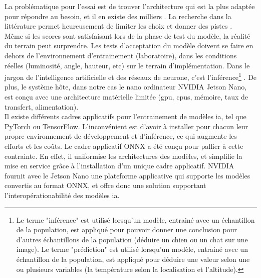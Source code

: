 \begin{comment}
Par exemple l'architecture "VGG" prend 2-3 semaines d'entrainement \parencite{simonyan_very_2015} avec 4 \acrshort{gpu} Titan Black (NVIDIA), coutant 1 200 \$US (Amazon.com) chacun (pour un total de 4 800\$US, et cela juste pour les \acrshort{gpu}s, qui ne sont qu'un des éléments de l'infrastructure nécessaire). Étant donné que de multiples tentatives sont nécessaires (cycles essai-erreur), la stratégie est d'entrainer plusieurs modèles en parallèle afin d'accélérer le développement, ce qui implique un cout élevé en infrastructure.
\end{comment}
La problématique pour l'essai est de trouver l'architecture qui est la plus adaptée pour répondre au besoin, et il en existe des milliers \parencite{koh_model_2018}. La recherche dans la littérature permet heureusement de limiter les choix et donner des pistes \parencite{zheng_real-time_2020, nguyen_mavnet_2019, nvidia_jetson_2019-1}. 
\vspace{\baselineskip}
\\
\noindent Même si les scores sont satisfaisant lors de la phase de test du modèle, la réalité du terrain peut surprendre. Les tests d'acceptation du modèle doivent se faire en dehors de l'environnement d'entrainement (laboratoire), dans les conditions réelles (luminosité, angle, hauteur, etc) sur le terrain d'implémentation. Dans le jargon de l'intelligence artificielle et des réseaux de neurone, c'est l'inférence\footnote{Le terme "inférence" est utilisé lorsqu'un modèle, entrainé avec un échantillon de la population, est appliqué pour pouvoir donner une conclusion pour d'autres échantillons de la population (déduire un chien ou un chat sur une image). Le terme "prédiction" est utilisé lorsqu'un modèle, entrainé avec un échantillon de la population, est appliqué pour déduire une valeur selon une ou plusieurs variables (la température selon la localisation et l'altitude).} \parencite{copel_whats_2016, nvidia_jetson_2019-1}. De plus, le système hôte, dans notre cas le nano ordinateur NVIDIA Jetson Nano, est conçu avec une architecture matérielle limitée (\acrshort{gpu}, \acrshort{cpu}s, mémoire, taux de transfert, alimentation). 
\vspace{\baselineskip}
\\
\noindent Il existe différents cadres applicatifs pour l'entrainement de modèles \acrshort{ia}, tel que PyTorch ou TensorFlow. L'inconvénient est d'avoir à installer pour chacun leur propre environnement de développement et d'inférence, ce qui augmente les efforts et les coûts. Le cadre applicatif ONNX a été conçu pour pallier à cette contrainte. En effet, il uniformise les architectures des modèles, et simplifie la mise en service grâce à l'installation d'un unique cadre applicatif. NVIDIA fournit avec le Jetson Nano une plateforme applicative qui supporte les modèles convertis au format ONNX, et offre donc une solution supportant l'interopérationabilité des modèles \acrshort{ia}. 